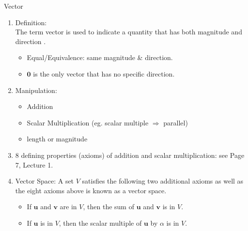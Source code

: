 \documentclass{beamer}
\begin{document}
\begin{frame}[allowframebreaks]{Vector}
\begin{enumerate}
	\item Definition: \\
	The term vector is used to indicate a quantity that has both
	magnitude and direction .
	\begin{itemize}
		\item Equal/Equivalence: \alert{same magnitude \& direction}.
		\item $\mathbf{0}$ is the only vector that has \alert{no specific direction}.
	\end{itemize}
	
	\item Manipulation:
	\begin{itemize}
		\item Addition
		\item Scalar Multiplication (eg. \alert{scalar multiple $\Rightarrow$ parallel})
		\item length or magnitude
	\end{itemize}
	
	\item \alert{8} defining properties (axioms) of addition and scalar multiplication: see Page 7, Lecture 1.
	
	\item {\color{green} Vector Space}:
	A set $V$ satisfies the following two additional axioms as well as the eight axioms above is known as a {\color{green} vector space}.
	\begin{itemize}
		\item If $\mathbf{u}$ and $\mathbf{v}$ are in $V$, then the sum of $\mathbf{u}$ and $\mathbf{v}$ is in $V$.
		\item If $\mathbf{u}$ is in $V$, then the scalar multiple of $\mathbf{u}$ by $\alpha$ is in $V$.
	\end{itemize}
	
\end{enumerate}

	
\end{frame}
\end{document}
